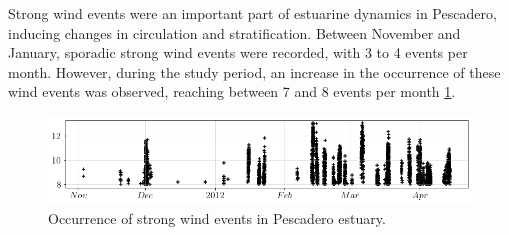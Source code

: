 \documentclass[tesis.tex]{subfiles}
\begin{document}




Strong wind events were an important part of estuarine dynamics in Pescadero, inducing changes in circulation and stratification. Between November and January, sporadic strong wind events were recorded, with 3 to 4 events per month. However, during the study period, an increase in the occurrence of these wind events was observed, reaching between 7 and 8 events per month \ref{fig:velwind2}. \\

\begin{figure}[h!]
    \centering
    \includegraphics[width=\textwidth]{Imagenes/viento_fuerte.png}
    \caption{Occurrence of strong wind events in Pescadero estuary.}
    \label{fig:velwind2}
\end{figure}
\end{document}
